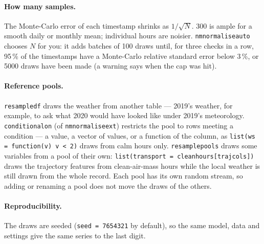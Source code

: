 \documentclass[11pt]{report}
\newcommand{\codeunderscore}{\textunderscore\allowbreak}
\newcommand{\code}[1]{\texttt{\let\_\codeunderscore #1}}
\begin{document}
\paragraph{How many samples.} The Monte-Carlo error of each timestamp shrinks as
$1/\sqrt{N}$. 300 is ample for a smooth daily or monthly mean; individual hours are
noisier. \code{nm\_normalise\_auto} chooses $N$ for you: it adds batches of 100 draws until,
for three checks in a row, 95\,\% of the timestamps have a Monte-Carlo relative standard
error below 3\,\%, or 5000 draws have been made (a warning says when the cap was hit).

\paragraph{Reference pools.} \code{resample\_df} draws the weather from another table ---
2019's weather, for example, to ask what 2020 would have looked like under 2019's
meteorology. \code{conditional\_on} (of \code{nm\_normalise\_ext}) restricts the pool to rows
meeting a condition --- a value, a vector of values, or a function of the column, as
\code{list(ws = function(v) v < 2)} draws from calm hours only. \code{resample\_pools}
draws some variables from a pool of their own: \code{list(transport = clean\_hours[traj\_cols])}
draws the trajectory features
from clean-air-mass hours while the local weather is still drawn from the whole record.
Each pool has its own random stream, so adding or renaming a pool does not move the draws
of the others.

\paragraph{Reproducibility.} The draws are seeded (\code{seed = 7654321} by default), so the
same model, data and settings give the same series to the last digit.
\end{document}
